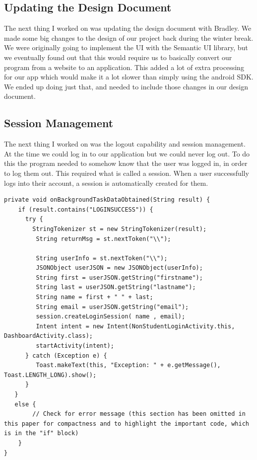 \documentclass[onecolumn, draftclsnofoot,10pt, compsoc]{IEEEtran}
\begin{document}
	\subsection{Updating the Design Document}
		The next thing I worked on was updating the design document with Bradley. We made some big changes to the design of our project back during the winter break. We were originally going to implement the UI with the Semantic UI library, but we eventually found out that this would require us to basically convert our program from a website to an application. This added a lot of extra processing for our app which would make it a lot slower than simply using the android SDK. We ended up doing just that, and needed to include those changes in our design document.

	\subsection{Session Management}
		The next thing I worked on was the logout capability and session management. At the time we could log in to our application but we could never log out. To do this the program needed to somehow know that the user was logged in, in order to log them out. This required what is called a session. When a user successfully logs into their account, a session is automatically created for them.
		\newpage

		\begin{lstlisting}[style=java]
private void onBackgroundTaskDataObtained(String result) {
	if (result.contains("LOGINSUCCESS")) {
      try {
      	StringTokenizer st = new StringTokenizer(result);
         String returnMsg = st.nextToken("\\");

         String userInfo = st.nextToken("\\");
         JSONObject userJSON = new JSONObject(userInfo);
         String first = userJSON.getString("firstname");
         String last = userJSON.getString("lastname");
         String name = first + " " + last;
         String email = userJSON.getString("email");
         session.createLoginSession( name , email);
         Intent intent = new Intent(NonStudentLoginActivity.this, DashboardActivity.class);
         startActivity(intent);
      } catch (Exception e) {
         Toast.makeText(this, "Exception: " + e.getMessage(), Toast.LENGTH_LONG).show();
      }
   }
   else {
		// Check for error message (this section has been omitted in this paper for compactness and to highlight the important code, which is in the "if" block)
	}
}
		\end{lstlisting}
\end{document}
